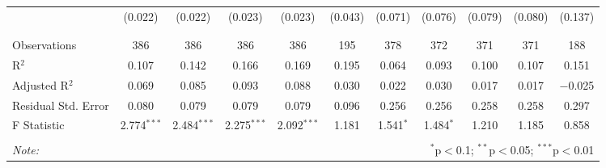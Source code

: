 \begin{table}[H]
\begin{tabular}{@{\extracolsep{4pt}}lcccccccccc}
  & (0.022) & (0.022) & (0.023) & (0.023) & (0.043) & (0.071) & (0.076) & (0.079) & (0.080) & (0.137) \\ 
  & & & & & & & & & & \\ 
\hline \\[-1.8ex] 
Observations & 386 & 386 & 386 & 386 & 195 & 378 & 372 & 371 & 371 & 188 \\ 
R$^{2}$ & 0.107 & 0.142 & 0.166 & 0.169 & 0.195 & 0.064 & 0.093 & 0.100 & 0.107 & 0.151 \\ 
Adjusted R$^{2}$ & 0.069 & 0.085 & 0.093 & 0.088 & 0.030 & 0.022 & 0.030 & 0.017 & 0.017 & $-$0.025 \\ 
Residual Std. Error & 0.080 & 0.079 & 0.079 & 0.079 & 0.096 & 0.256 & 0.256 & 0.258 & 0.258 & 0.297 \\ 
F Statistic & 2.774$^{***}$ & 2.484$^{***}$ & 2.275$^{***}$ & 2.092$^{***}$ & 1.181 & 1.541$^{*}$ & 1.484$^{*}$ & 1.210 & 1.185 & 0.858 \\ 
\hline 
\hline \\[-1.8ex] 
\textit{Note:}  & \multicolumn{10}{r}{$^{*}$p$<$0.1; $^{**}$p$<$0.05; $^{***}$p$<$0.01} \\ 
\end{tabular} 
\end{table} 
